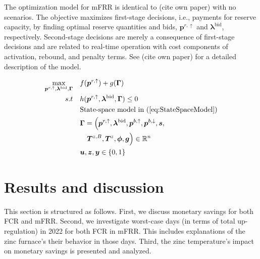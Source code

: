 \documentclass[lettersize,journal]{IEEEtran}
\begin{document}
The optimization model for mFRR is identical to (cite own paper) with no scenarios. The objective maximizes first-stage decisions, i.e., payments for reserve capacity, by finding optimal reserve quantities and bids, $\bm{p}^{r,\uparrow}$ and $\bm{\lambda}^{\text{bid}}$, respectively. Second-stage decisions are merely a consequence of first-stage decisions and are related to real-time operation with cost components of activation, rebound, and penalty terms. See (cite own paper) for a detailed description of the model.

\begin{subequations}\label{P2:compact_model_mfrr}
    \begin{align}
        \underset{\bm{p}^{r,\uparrow}, \bm{\lambda}^{\text{bid}}, \bm{\Gamma}}{\textrm{max}} \quad & f(\bm{p}^{r,\uparrow}) + g(\bm{\Gamma}) \label{P2:eq1}
        \\
        s.t \quad                                                                                  & h(\bm{p}^{r,\uparrow}, \bm{\lambda}^{\text{bid}}, \bm{\Gamma}) \leq 0\label{P2:eq2}                                             \\
        \quad                                                                                      & \text{State-space model in } (\ref{eq:StateSpaceModel}) \label{P2:eq3}
        \\
        \quad                                                                                      & \bm{\Gamma} = \Bigl( \bm{p}^{r,\uparrow}, \bm{\lambda}^{\text{bid}}, \bm{p}^{b,\uparrow}, \bm{p}^{b,\downarrow}, \bm{s}, \notag \\ \quad & \quad \bm{T}^{z, B}, \bm{T}^{z}, \bm{\phi}, \bm{g} \Bigr) \in \mathbb{R}^{n}  \label{P2:eq4}
        \\
        \quad                                                                                      & \bm{u}, \bm{z}, \bm{y} \in \{0,1\}  \label{P2:eq5}
    \end{align}
\end{subequations}


\section{Results and discussion}

This section is structured as follows. First, we discuss monetary savings for both FCR and mFRR. Second, we investigate worst-case days (in terms of total up-regulation) in 2022 for both FCR in mFRR. This includes explanations of the zinc furnace's their behavior in those days. Third, the zinc temperature's impact on monetary savings is presented and analyzed.
\end{document}
